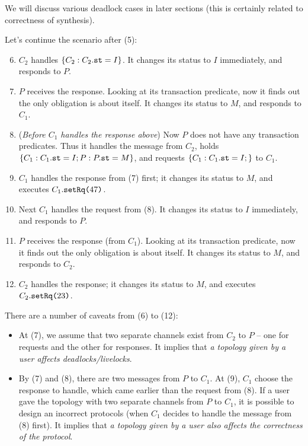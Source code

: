 \documentclass[format=manuscript]{acmart}
\begin{document}
We will discuss various deadlock cases in later sections (this is certainly
related to correctness of synthesis).

Let's continue the scenario after (5):

\begin{enumerate}
  \setcounter{enumi}{5}
\item $C_2$ handles $\{ C_2: C_2.\texttt{st} = I \}$. It changes its status to $I$
  immediately, and responds to $P$.
\item $P$ receives the response. Looking at its transaction predicate, now it
  finds out the only obligation is about itself. It changes its status to $M$,
  and responds to $C_1$.
\item (\emph{Before $C_1$ handles the response above}) Now $P$ does not have any
  transaction predicates. Thus it handles the message from $C_2$, holds $\{ C_1:
  C_1.\texttt{st} = I; P: P.\texttt{st} = M \}$, and requests $\{ C_1: C_1.\texttt{st} = I; \}$
  to $C_1$.
\item $C_1$ handles the response from (7) first; it changes its status to $M$,
  and executes $C_1.\texttt{setRq(}47\texttt{)}$.
\item Next $C_1$ handles the request from (8). It changes its status to $I$
  immediately, and responds to $P$.
\item $P$ receives the response (from $C_1$). Looking at its transaction
  predicate, now it finds out the only obligation is about itself. It changes
  its status to $M$, and responds to $C_2$.
\item $C_2$ handles the response; it changes its status to $M$, and executes
  $C_2.\texttt{setRq(}23\texttt{)}$.
\end{enumerate}

There are a number of caveats from (6) to (12):

\begin{itemize}
\item At (7), we assume that two separate channels exist from $C_2$ to $P$ --
  one for requests and the other for responses. It implies that \emph{a topology
    given by a user affects deadlocks/livelocks}.
\item By (7) and (8), there are two messages from $P$ to $C_1$. At (9), $C_1$
  choose the response to handle, which came earlier than the request from (8).
  If a user gave the topology with two separate channels from $P$ to $C_1$, it
  is possible to design an incorrect protocols (when $C_1$ decides to handle the
  message from (8) first). It implies that \emph{a topology given by a user also
    affects the correctness of the protocol}.
\end{itemize}
\end{document}
